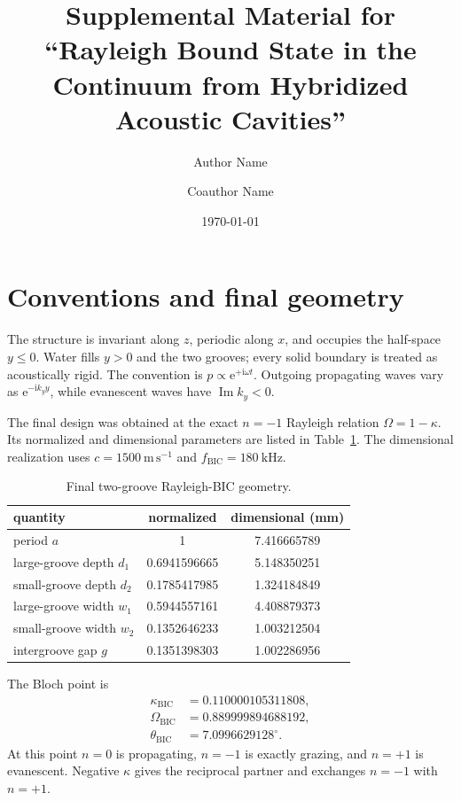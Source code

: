 \documentclass[aps,prl,reprint,superscriptaddress,nofootinbib,floatfix]{revtex4-2}
\newcommand{\ii}{\mathrm{i}}
\newcommand{\e}{\mathrm{e}}
\newcommand{\BIC}{\mathrm{BIC}}
\begin{document}
\title{Supplemental Material for ``Rayleigh Bound State in the Continuum from Hybridized Acoustic Cavities''}
\author{Author Name}
\author{Coauthor Name}
\date{\today}
\maketitle

\section{Conventions and final geometry}

The structure is invariant along $z$, periodic along $x$, and occupies the
half-space $y\leq0$.  Water fills $y>0$ and the two grooves; every solid
boundary is treated as acoustically rigid.  The convention is
$p\propto\e^{+\ii\omega t}$.  Outgoing propagating waves vary as
$\e^{-\ii k_y y}$, while evanescent waves have $\operatorname{Im}k_y<0$.

The final design was obtained at the exact $n=-1$ Rayleigh relation
$\Omega=1-\kappa$.  Its normalized and dimensional parameters are listed in
Table~\ref{tab:geometry}.  The dimensional realization uses
$c=1500~\mathrm{m\,s^{-1}}$ and $f_{\BIC}=180~\mathrm{kHz}$.

\begin{table}[b]
\caption{\label{tab:geometry}Final two-groove Rayleigh-BIC geometry.}
\begin{ruledtabular}
\begin{tabular}{lcc}
quantity & normalized & dimensional (mm)\\
\hline
period $a$ & 1 & 7.416665789\\
large-groove depth $d_1$ & 0.6941596665 & 5.148350251\\
small-groove depth $d_2$ & 0.1785417985 & 1.324184849\\
large-groove width $w_1$ & 0.5944557161 & 4.408879373\\
small-groove width $w_2$ & 0.1352646233 & 1.003212504\\
intergroove gap $g$ & 0.1351398303 & 1.002286956\\
\end{tabular}
\end{ruledtabular}
\end{table}

The Bloch point is
\begin{equation}
 \begin{aligned}
 \kappa_{\BIC}&=0.110000105311808,\\
 \Omega_{\BIC}&=0.889999894688192,\\
 \theta_{\BIC}&=7.0996629128^{\circ}.
 \end{aligned}
 \label{eq:s-point}
\end{equation}
At this point $n=0$ is propagating, $n=-1$ is exactly grazing, and $n=+1$
is evanescent.  Negative $\kappa$ gives the reciprocal partner and exchanges
$n=-1$ with $n=+1$.
\end{document}
